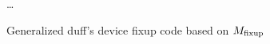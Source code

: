 \begin{figure}[H]
    \begin{algorithmic}
        \Switch{$\Mfixup$}
                \State {}
            \EndCase
                \State {}
            \EndCase
            \State \ldots
                \State {}
            \EndCase
        \EndSwitch
    \end{algorithmic}
    \caption{Generalized duff's device fixup code based on $\Mfixup$}
    \label{fig:impl:fixup:duff:fixup-M_fixup}
\end{figure}